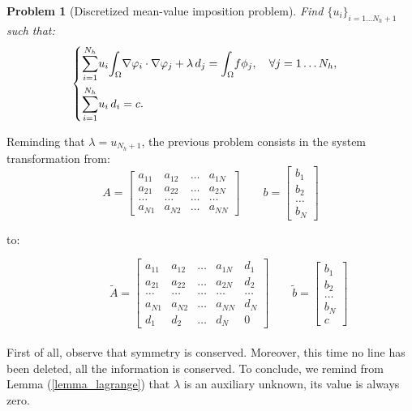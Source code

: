 \documentclass[a4paper,11pt]{article}
\newtheorem{problem}{Problem}
\begin{document}
\begin{problem}[Discretized mean-value imposition problem]
	Find $\{u_i\}_{i=1\dots N_h+1}$ such that:
	\begin{equation*}
	\begin{cases}
	\mathlarger{\sum}_{i=1}^{N_h} u_i \mathlarger{\int}_{\Omega}\nabla\varphi_i \cdot \nabla \varphi_j + \lambda \,d_j=\mathlarger{\int}_{\Omega}f\phi_j, \quad \forall j=1\dots N_h, \\[3ex]
	\mathlarger{\sum}_{i=1}^{N_h} u_i \,d_i = c.
	\end{cases}
	\end{equation*}
\end{problem}
\vspace{3mm}
\noindent Reminding that $\lambda=u_{N_h+1}$, the previous problem consists in the system transformation from: \\
\begin{equation*}
A=\begin{bmatrix}
a_{11} & a_{12} & \dots & a_{1N} \\ 
a_{21} & a_{22} & \dots & a_{2N} \\ 
\dots & \dots & \dots & \dots \\
a_{N1}  & a_{N2} & \dots & a_{NN}
\end{bmatrix} \quad \quad
b=\begin{bmatrix}
b_1 \\ b_2 \\ \dots \\ b_N
\end{bmatrix}
\end{equation*}

to:

\begin{equation*}
\quad \quad  \quad \, \tilde{A}=\begin{bmatrix}
a_{11} & a_{12} & \dots & a_{1N} & d_1\\ 
a_{21} & a_{22} & \dots & a_{2N} & d_2 \\ 
\dots & \dots & \dots & \dots & \dots \\
a_{N1}  & a_{N2} & \dots & a_{NN} & d_N \\
d_1 & d_2 & \dots & d_N & 0
\end{bmatrix} \quad \quad
\tilde{b}=\begin{bmatrix}
b_1 \\ b_2 \\ \dots \\ b_N \\ c
\end{bmatrix}
\end{equation*}
\vspace{3mm} \\
\noindent First of all, observe that symmetry is conserved. Moreover, this time no line has been deleted, all the information is conserved. To conclude, we remind from Lemma (\ref{lemma_lagrange}) that $\lambda$ is an auxiliary unknown, its value is always zero. \\
\end{document}
